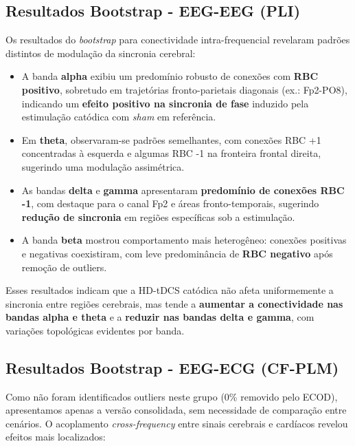 \subsection{Resultados Bootstrap - EEG-EEG (PLI)}

Os resultados do \textit{bootstrap} para conectividade intra-frequencial revelaram padrões distintos de modulação da sincronia cerebral:

\begin{itemize}
  \item A banda \textbf{alpha} exibiu um predomínio robusto de conexões com \textbf{RBC positivo}, sobretudo em trajetórias fronto-parietais diagonais (ex.: Fp2-PO8), indicando um \textbf{efeito positivo na sincronia de fase} induzido pela estimulação catódica com \textit{sham} em referência.
  \item Em \textbf{theta}, observaram-se padrões semelhantes, com conexões RBC +1 concentradas à esquerda e algumas RBC -1 na fronteira frontal direita, sugerindo uma modulação assimétrica.
  \item As bandas \textbf{delta} e \textbf{gamma} apresentaram \textbf{predomínio de conexões RBC -1}, com destaque para o canal Fp2 e áreas fronto-temporais, sugerindo \textbf{redução de sincronia} em regiões específicas sob a estimulação.
  \item A banda \textbf{beta} mostrou comportamento mais heterogêneo: conexões positivas e negativas coexistiram, com leve predominância de \textbf{RBC negativo} após remoção de outliers.
\end{itemize}

Esses resultados indicam que a HD-tDCS catódica não afeta uniformemente a sincronia entre regiões cerebrais, mas tende a \textbf{aumentar a conectividade nas bandas alpha e theta} e a \textbf{reduzir nas bandas delta e gamma}, com variações topológicas evidentes por banda.

\subsection{Resultados Bootstrap - EEG-ECG (CF-PLM)}

Como não foram identificados outliers neste grupo (0\% removido pelo ECOD), apresentamos apenas a versão consolidada, sem necessidade de comparação entre cenários. O acoplamento \textit{cross-frequency} entre sinais cerebrais e cardíacos revelou efeitos mais localizados:

